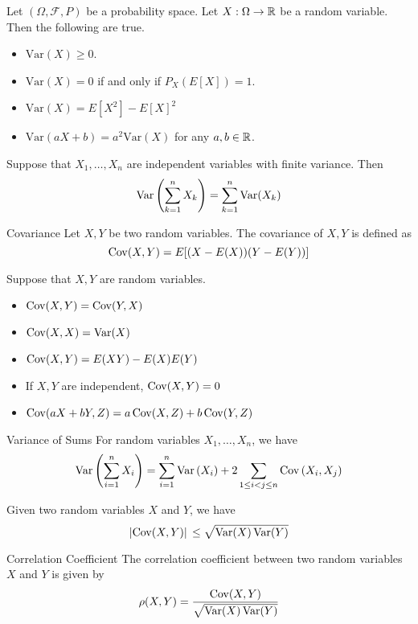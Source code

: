 \documentclass[a4paper]{article}
\begin{document}
\begin{lmm}{}{} Let $(\Omega,\mathcal{F},P)$ be a probability space. Let $X:\Omega\to\mathbb{R}$ be a random variable. Then the following are true. 
\begin{itemize}
\item $\text{Var}(X)\geq 0$. 
\item $\text{Var}(X)=0$ if and only if $P_X(E[X])=1$. 
\item $\text{Var}(X)=E[X^2]-E[X]^2$
\item $\text{Var}(aX+b)=a^2\text{Var}(X)$ for any $a,b\in\mathbb{R}$. 
\end{itemize}
\end{lmm}

\begin{prp}{}{} Suppose that $X_1,\dots,X_n$ are independent variables with finite variance. Then $$\operatorname{Var}\left(\sum_{k=1}^nX_k\right)=\sum_{k=1}^n\operatorname{Var}(X_k)$$
\end{prp}

\begin{defn}{Covariance}{} Let $X,Y$ be two random variables. The covariance of $X,Y$ is defined as $$\operatorname{Cov}(X,Y)=E[(X-E(X))(Y-E(Y))]$$
\end{defn}

\begin{prp}{}{} Suppose that $X,Y$ are random variables. 
\begin{itemize}
\item $\operatorname{Cov}(X,Y)=\operatorname{Cov}(Y,X)$
\item $\operatorname{Cov}(X,X)=\operatorname{Var}(X)$
\item $\operatorname{Cov}(X,Y)=E(XY)-E(X)E(Y)$
\item If $X,Y$ are independent, $\operatorname{Cov}(X,Y)=0$
\item $\operatorname{Cov}(aX+bY,Z)=a\operatorname{Cov}(X,Z)+b\operatorname{Cov}(Y,Z)$
\end{itemize}
\end{prp}

\begin{prp}{Variance of Sums}{} For random variables $X_1,\dots,X_n$, we have $$\operatorname{Var}\left(\sum_{i=1}^{n}X_i\right)=\sum_{i=1}^n\operatorname{Var}\left(X_i\right)+2\sum_{1\leq i<j\leq n}\operatorname{Cov}\left(X_i,X_j\right)$$
\end{prp}

\begin{thm}{}{} Given two random variables $X$ and $Y$, we have $$\abs*{\operatorname{Cov}(X,Y)}\leq\sqrt{\operatorname{Var}(X)\operatorname{Var}(Y)}$$
\end{thm}

\begin{thm}{Correlation Coefficient}{} The correlation coefficient between two random variables $X$ and $Y$ is given by $$\rho(X,Y)=\frac{\operatorname{Cov}(X,Y)}{\sqrt{\operatorname{Var}(X)\operatorname{Var}(Y)}}$$
\end{thm}
\end{document}
